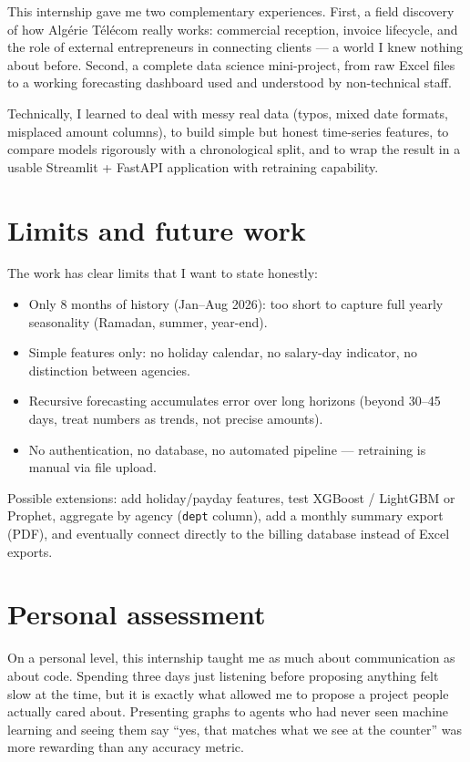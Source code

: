 \documentclass[12pt,a4paper]{report}
\begin{document}
This internship gave me two complementary experiences. First, a field discovery of how Algérie Télécom really works: commercial reception, invoice lifecycle, and the role of external entrepreneurs in connecting clients --- a world I knew nothing about before. Second, a complete data science mini-project, from raw Excel files to a working forecasting dashboard used and understood by non-technical staff.

Technically, I learned to deal with messy real data (typos, mixed date formats, misplaced amount columns), to build simple but honest time-series features, to compare models rigorously with a chronological split, and to wrap the result in a usable Streamlit + FastAPI application with retraining capability.

\section{Limits and future work}

The work has clear limits that I want to state honestly:

\begin{itemize}
\item Only 8 months of history (Jan--Aug 2026): too short to capture full yearly seasonality (Ramadan, summer, year-end).
\item Simple features only: no holiday calendar, no salary-day indicator, no distinction between agencies.
\item Recursive forecasting accumulates error over long horizons (beyond 30--45 days, treat numbers as trends, not precise amounts).
\item No authentication, no database, no automated pipeline --- retraining is manual via file upload.
\end{itemize}

Possible extensions: add holiday/payday features, test XGBoost / LightGBM or Prophet, aggregate by agency (\texttt{dept} column), add a monthly summary export (PDF), and eventually connect directly to the billing database instead of Excel exports.

\section{Personal assessment}

On a personal level, this internship taught me as much about communication as about code. Spending three days just listening before proposing anything felt slow at the time, but it is exactly what allowed me to propose a project people actually cared about. Presenting graphs to agents who had never seen machine learning and seeing them say ``yes, that matches what we see at the counter'' was more rewarding than any accuracy metric.
\end{document}
